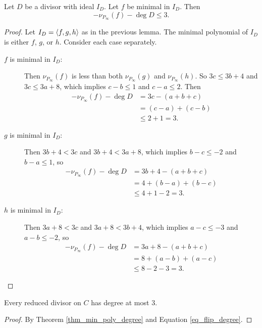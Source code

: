 \begin{theorem}
  \label{thm_min_poly_degree}
  Let $D$ be a divisor with ideal $I_D$.
  Let $f$ be minimal in $I_D$. Then
  \[ -\nu_{P_\infty}(f) - \deg D \leq 3. \]
\end{theorem}
\begin{proof}
  Let $I_D = \left\langle f, g, h \right\rangle$ as in the previous lemma.
  The minimal polynomial of $I_D$ is either $f$, $g$, or $h$.
  Consider each case separately.
  \begin{description}
    \item[$f$ is minimal in $I_D$:]
      Then $\nu_{P_\infty}(f)$ is less than both $\nu_{P_\infty}(g)$ and $\nu_{P_\infty}(h)$.
      So $3c \leq 3b + 4$ and $3c \leq 3a + 8$, which implies
      $c - b \leq 1$ and $c - a \leq 2$. Then
      \begin{align*}
        -\nu_{P_\infty}(f) - \deg D
          &= 3c - (a + b + c) \\
          &= (c - a) + (c - b) \\
          &\leq 2 + 1 = 3.
      \end{align*}
      
    \item[$g$ is minimal in $I_D$:]
      Then $3b + 4 < 3c$ and $3b + 4 < 3a + 8$,
      which implies $b - c \leq -2$ and $b - a \leq 1$, so
      \begin{align*}
        -\nu_{P_\infty}(f) - \deg D
          &= 3b + 4 - (a + b + c) \\
          &= 4 + (b - a) + (b - c) \\
          &\leq 4 + 1 - 2 = 3.
      \end{align*}

    \item[$h$ is minimal in $I_D$:]
      Then $3a + 8 < 3c$ and $3a + 8 < 3b + 4$,
      which implies $a - c \leq -3$ and $a - b \leq -2$, so
      \begin{align*}
        -\nu_{P_\infty}(f) - \deg D
          &= 3a + 8 - (a + b + c) \\
          &= 8 + (a - b) + (a - c) \\
          &\leq 8 - 2 - 3 = 3.
      \end{align*}
  \end{description}
\end{proof}

\begin{theorem}
  Every reduced divisor on $C$ has degree at most 3.
\end{theorem}
\begin{proof}
  By Theorem \ref{thm_min_poly_degree} and Equation \ref{eq_flip_degree}.
\end{proof}

